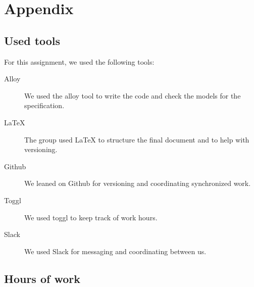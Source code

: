 \documentclass{article}
\begin{document}
	\newpage
	\section{Appendix}
		\listoffigures
		\listoftables
		
		\subsection{Used tools}
		For this assignment, we used the following tools:
		
		\begin{description}
			\item [Alloy] We used the alloy tool to write the code and check the models for the specification.
			\item [LaTeX] The group used LaTeX to structure the final document and to help with versioning.
			\item [Github] We leaned on Github for versioning and coordinating synchronized work.
			\item [Toggl] We used toggl to keep track of work hours.
			\item [Slack] We used Slack for messaging and coordinating between us.
			
		\end{description}
		
		\subsection{Hours of work}
\end{document}
